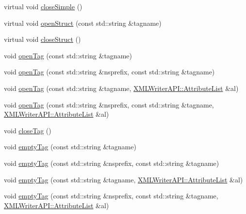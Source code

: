 \begin{DoxyCompactItemize}
\item 
virtual void \mbox{\hyperlink{classADATXML_1_1XMLWriter_a7141f35d34f4d15bbaf15d9124a4e054}{close\+Simple}} ()
\item 
virtual void \mbox{\hyperlink{classADATXML_1_1XMLWriter_a8f9728743acfd9c15ab5d69bf8800a5e}{open\+Struct}} (const std\+::string \&tagname)
\item 
virtual void \mbox{\hyperlink{classADATXML_1_1XMLWriter_abef3ef70df40a5e9e71c99c56f133589}{close\+Struct}} ()
\item 
void \mbox{\hyperlink{classADATXML_1_1XMLWriter_a75da06c5e515ccd9d519501915f50a8f}{open\+Tag}} (const std\+::string \&tagname)
\item 
void \mbox{\hyperlink{classADATXML_1_1XMLWriter_aa65d48238c4b08ebcedd534501e7cbaa}{open\+Tag}} (const std\+::string \&nsprefix, const std\+::string \&tagname)
\item 
void \mbox{\hyperlink{classADATXML_1_1XMLWriter_a0d90742225631452502c6716ee737fef}{open\+Tag}} (const std\+::string \&tagname, \mbox{\hyperlink{namespaceXMLWriterAPI_a28cf3d8051a4ccf0aef208b7ebc66d07}{X\+M\+L\+Writer\+A\+P\+I\+::\+Attribute\+List}} \&al)
\item 
void \mbox{\hyperlink{classADATXML_1_1XMLWriter_a26795936be9ebee12c374fa82065ffb5}{open\+Tag}} (const std\+::string \&nsprefix, const std\+::string \&tagname, \mbox{\hyperlink{namespaceXMLWriterAPI_a28cf3d8051a4ccf0aef208b7ebc66d07}{X\+M\+L\+Writer\+A\+P\+I\+::\+Attribute\+List}} \&al)
\item 
void \mbox{\hyperlink{classADATXML_1_1XMLWriter_a13209ef7863272707bf8fea7c172e9f1}{close\+Tag}} ()
\item 
void \mbox{\hyperlink{classADATXML_1_1XMLWriter_a7749a56b9e15992d3168f808b2ad02c5}{empty\+Tag}} (const std\+::string \&tagname)
\item 
void \mbox{\hyperlink{classADATXML_1_1XMLWriter_a7941500f8d733594745588b65ff4789c}{empty\+Tag}} (const std\+::string \&nsprefix, const std\+::string \&tagname)
\item 
void \mbox{\hyperlink{classADATXML_1_1XMLWriter_a48c5adaca1b1c8126047c410c86644f3}{empty\+Tag}} (const std\+::string \&tagname, \mbox{\hyperlink{namespaceXMLWriterAPI_a28cf3d8051a4ccf0aef208b7ebc66d07}{X\+M\+L\+Writer\+A\+P\+I\+::\+Attribute\+List}} \&al)
\item 
void \mbox{\hyperlink{classADATXML_1_1XMLWriter_a7b356346477d6f2e8e2d2db7553147dc}{empty\+Tag}} (const std\+::string \&nsprefix, const std\+::string \&tagname, \mbox{\hyperlink{namespaceXMLWriterAPI_a28cf3d8051a4ccf0aef208b7ebc66d07}{X\+M\+L\+Writer\+A\+P\+I\+::\+Attribute\+List}} \&al)

\end{DoxyCompactItemize}
